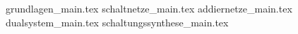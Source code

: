 
{grundlagen_main.tex}
{schaltnetze_main.tex}
{addiernetze_main.tex}
{dualsystem_main.tex}
{schaltungssynthese_main.tex}